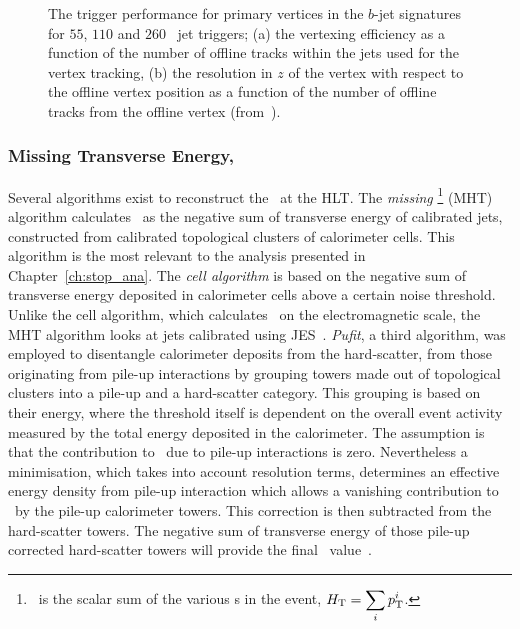 					\begin{figure}[!htb]
						\begin{center}
							\hspace{0.05\textwidth}
						\end{center}
						\caption{The trigger performance for primary vertices in the $b$-jet signatures for $55$, $110$ and $260$ \GeV\ jet triggers; (a) the vertexing efficiency as a function of the number of offline tracks within the jets used for the vertex tracking, (b) the resolution in $z$ of the vertex with respect to the offline vertex position as a function of the number of offline tracks from the offline vertex (from~\cite{ATLASTrigger2015}).}
						\label{fig:bjetvertex}
					\end{figure}

				\subsubsection*{Missing Transverse Energy, \met}

					Several algorithms exist to reconstruct the \met\ at the \ac{HLT}. The \textit{missing} \HT\footnote{\HT\ is the scalar sum of the various \pt s in the event, $\displaystyle H_{\mathrm{T}} = \sum_{i} p_{\mathrm{T}}^i$.} (MHT) algorithm calculates \met\ as the negative sum of transverse energy of calibrated jets, constructed from calibrated topological clusters of calorimeter cells. This algorithm is the most relevant to the analysis presented in Chapter~\ref{ch:stop_ana}. The \textit{cell algorithm} is based on the negative sum of transverse energy deposited in calorimeter cells above a certain noise threshold. Unlike the cell algorithm, which calculates \met\ on the electromagnetic scale, the MHT algorithm looks at jets calibrated using \ac{JES}~\cite{ATL-PHYS-PUB-2015-015}. \textit{Pufit}, a third algorithm, was employed to disentangle calorimeter deposits from the hard-scatter, from those originating from pile-up interactions by grouping towers made out of topological clusters into a pile-up and a hard-scatter category. This grouping is based on their energy, where the threshold itself is dependent on the overall event activity measured by the total energy deposited in the calorimeter. The assumption is that the contribution to \met\ due to pile-up interactions is zero. Nevertheless a minimisation, which takes into account resolution terms, determines an effective energy density from pile-up interaction which allows a vanishing contribution to \met\ by the pile-up calorimeter towers. This correction is then subtracted from the hard-scatter towers. The negative sum of transverse energy of those pile-up corrected hard-scatter towers will provide the final \met\ value~\cite{ATL-COM-DAQ-2016-137}.

